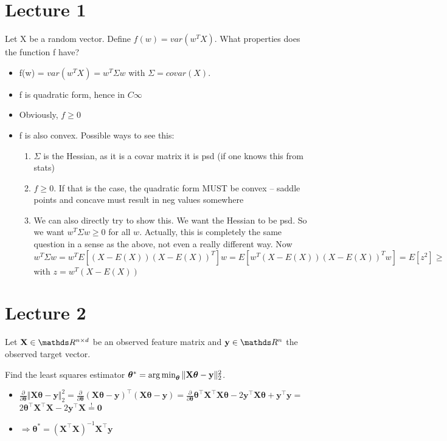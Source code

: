 \documentclass[a4paper]{article}
\begin{document}






\section{Lecture 1}
Let X be a random vector. Define $f(w) = var(w^T X)$. What properties does the function f have?
\begin{itemize}
    \item f(w) = $var(w^T X) = w^T \Sigma w$ with $\Sigma = covar(X)$. 
    \item f is quadratic form, hence in $C\infty$
    \item Obviously, $f \geq 0$
    \item f is also convex. Possible ways to see this:
\begin{enumerate}
    \item $\Sigma$ is the Hessian, as it is a covar matrix it is psd (if one knows this from stats)
    \item $f \geq 0$. If that is the case, the quadratic form MUST be convex -- saddle points and concave must result in neg values somewhere
    \item We can also directly try to show this. We want the Hessian to be psd. So we want $w^T \Sigma w \geq 0$ for all $w$. Actually, this is completely the same question in a sense as the above, not even a really different way. Now
    $$w^T \Sigma w = w^T E[ (X - E(X)) (X - E(X))^T] w = 
    E[ w^T (X - E(X)) (X - E(X))^T w] = E[z^2] \geq 
    $$
    with $z =  w^T (X - E(X))$
\end{enumerate}
    
\end{itemize}
\section{Lecture 2}

Let $\mathbf{X} \in \R^{n \times d}$ be an observed feature matrix and $\mathbf{y} \in \R^n$ the observed target vector.

Find the least squares estimator $\bm{\theta}^* =  \operatorname{arg\,min}_{\bm{\theta}} \Vert \mathbf{X} \bm{\theta} - \mathbf{y}\Vert^2_2$.
\begin{itemize}
    \item $\frac{\partial}{\partial  \bm{\theta}} \Vert \mathbf{X} \bm{\theta} - \mathbf{y}\Vert^2_2 = \frac{\partial}{\partial  \bm{\theta}} (\mathbf{X} \bm{\theta} - \mathbf{y})^\top (\mathbf{X} \bm{\theta} - \mathbf{y}) = \frac{\partial}{\partial  \bm{\theta}} \bm{\theta}^\top\mathbf{X}^\top \mathbf{X} \bm{\theta} - 2\mathbf{y}^\top\mathbf{X} \bm{\theta} + \mathbf{y}^\top\mathbf{y} =$ \\ $2\bm{\theta}^\top\mathbf{X}^\top \mathbf{X} -2\mathbf{y}^\top\mathbf{X} \overset{!}{=} \mathbf{0}$ 
    \item $\Rightarrow \bm{\theta}^* = (\mathbf{X}^\top \mathbf{X})^{-1}\mathbf{X}^\top \mathbf{y}$
\end{itemize}
\end{document}
